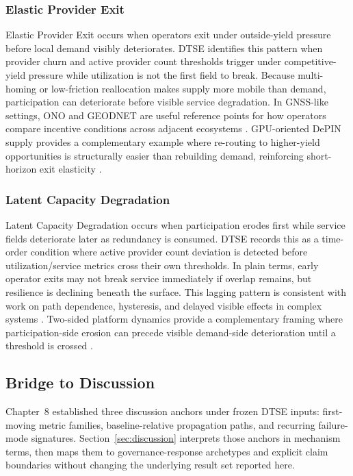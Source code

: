 \subsubsection{Elastic Provider Exit}
Elastic Provider Exit occurs when operators exit under outside-yield pressure before local demand visibly deteriorates. DTSE identifies this pattern when provider churn and active provider count thresholds trigger under competitive-yield pressure while utilization is not the first field to break. Because multi-homing or low-friction reallocation makes supply more mobile than demand, participation can deteriorate before visible service degradation. In GNSS-like settings, ONO and GEODNET are useful reference points for how operators compare incentive conditions across adjacent ecosystems \cite{OnocoyRewards, GeodnetLocationNFT}. GPU-oriented DePIN supply provides a complementary example where re-routing to higher-yield opportunities is structurally easier than rebuilding demand, reinforcing short-horizon exit elasticity \cite{Lin2024, Chiu2024}.

\subsubsection{Latent Capacity Degradation}
Latent Capacity Degradation occurs when participation erodes first while service fields deteriorate later as redundancy is consumed. DTSE records this as a time-order condition where active provider count deviation is detected before utilization/service metrics cross their own thresholds. In plain terms, early operator exits may not break service immediately if overlap remains, but resilience is declining beneath the surface. This lagging pattern is consistent with work on path dependence, hysteresis, and delayed visible effects in complex systems \cite{Arthur1989, Morris2019, Ballandies2023}. Two-sided platform dynamics provide a complementary framing where participation-side erosion can precede visible demand-side deterioration until a threshold is crossed \cite{RochetTirole2003}.

\subsection{Bridge to Discussion}
\label{subsec:deferred_interpretation_register}
Chapter~8 established three discussion anchors under frozen DTSE inputs: first-moving metric families, baseline-relative propagation paths, and recurring failure-mode signatures. Section~\ref{sec:discussion} interprets those anchors in mechanism terms, then maps them to governance-response archetypes and explicit claim boundaries without changing the underlying result set reported here.
